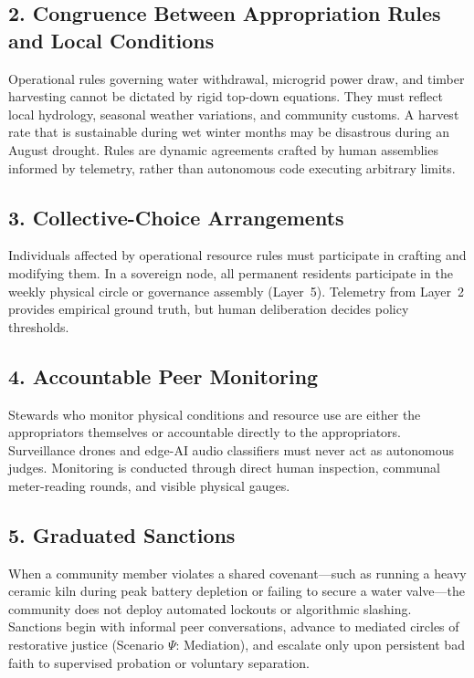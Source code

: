 \subsection{2. Congruence Between Appropriation Rules and Local Conditions}
Operational rules governing water withdrawal, microgrid power draw, and timber harvesting cannot be dictated by rigid top-down equations. They must reflect local hydrology, seasonal weather variations, and community customs. A harvest rate that is sustainable during wet winter months may be disastrous during an August drought. Rules are dynamic agreements crafted by human assemblies informed by telemetry, rather than autonomous code executing arbitrary limits.

\subsection{3. Collective-Choice Arrangements}
Individuals affected by operational resource rules must participate in crafting and modifying them. In a sovereign node, all permanent residents participate in the weekly physical circle or governance assembly (Layer~5). Telemetry from Layer~2 provides empirical ground truth, but human deliberation decides policy thresholds.

\subsection{4. Accountable Peer Monitoring}
Stewards who monitor physical conditions and resource use are either the appropriators themselves or accountable directly to the appropriators. Surveillance drones and edge-AI audio classifiers must never act as autonomous judges. Monitoring is conducted through direct human inspection, communal meter-reading rounds, and visible physical gauges.

\subsection{5. Graduated Sanctions}
When a community member violates a shared covenant---such as running a heavy ceramic kiln during peak battery depletion or failing to secure a water valve---the community does not deploy automated lockouts or algorithmic slashing. Sanctions begin with informal peer conversations, advance to mediated circles of restorative justice (Scenario $\Psi$: Mediation), and escalate only upon persistent bad faith to supervised probation or voluntary separation.

